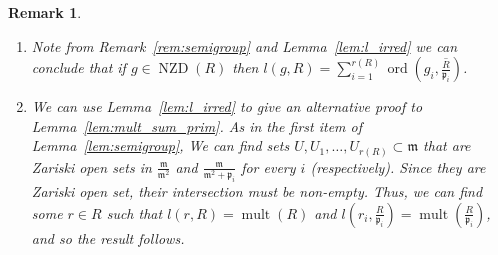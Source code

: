 \documentclass{article}
\newtheorem{remark}[theorem]{Remark}
\DeclareMathOperator{\ord}{ord}
\DeclareMathOperator{\length}{length}
\DeclareMathOperator{\NZD}{NZD}
\DeclareMathOperator{\mult}{mult}
\numberwithin{theorem}{section}
\begin{document}

\begin{remark}\label{cor:sum_length}
\begin{enumerate}
    \item \textup{Note from Remark~\ref{rem:semigroup} and Lemma~\ref{lem:l_irred} we can conclude that if $g \in \NZD(R)$ then $l(g,R) = \sum_{i=1}^{r(R)} \ord\left(g_i, \overline{\frac{R}{\mathfrak{p}_i}}\right)$.}
    \item \textup{We can use Lemma~\ref{lem:l_irred} to give an alternative proof to Lemma~\ref{lem:mult_sum_prim}. As in the first item of Lemma~\ref{lem:semigroup}, We can find sets $U, U_1, \dots, U_{r(R)} \subset \mathfrak{m}$ that are Zariski open sets in $\frac{\mathfrak{m}}{\mathfrak{m}^2}$ and $\frac{\mathfrak{m}}{\mathfrak{m}^2 + \mathfrak{p}_i}$ for every $i$ (respectively). Since they are Zariski open set, their intersection must be non-empty. Thus, we can find some $r \in R$ such that $l(r,R)=\mult(R)$ and $l\left(r_i,\frac{R}{\mathfrak{p}_i}\right)=\mult\left(\frac{R}{\mathfrak{p}_i}\right)$, and so the result follows.} 
\end{enumerate}
\end{remark}
\end{document}

